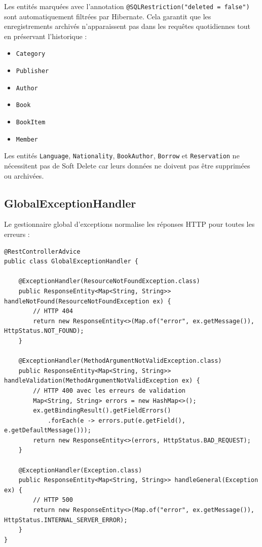 \documentclass[12pt,a4paper,twoside]{report}
\begin{document}
Les entités marquées avec l'annotation \texttt{@SQLRestriction("deleted = false")} sont automatiquement filtrées par Hibernate. Cela garantit que les enregistrements archivés n'apparaissent pas dans les requêtes quotidiennes tout en préservant l'historique :

\begin{itemize}
    \item \texttt{Category}
    \item \texttt{Publisher}
    \item \texttt{Author}
    \item \texttt{Book}
    \item \texttt{BookItem}
    \item \texttt{Member}
\end{itemize}

Les entités \texttt{Language}, \texttt{Nationality}, \texttt{BookAuthor}, \texttt{Borrow} et \texttt{Reservation} ne nécessitent pas de Soft Delete car leurs données ne doivent pas être supprimées ou archivées.

\subsection{GlobalExceptionHandler}

Le gestionnaire global d'exceptions normalise les réponses HTTP pour toutes les erreurs :

\begin{lstlisting}[caption=GlobalExceptionHandler (extrait)]
@RestControllerAdvice
public class GlobalExceptionHandler {

    @ExceptionHandler(ResourceNotFoundException.class)
    public ResponseEntity<Map<String, String>> handleNotFound(ResourceNotFoundException ex) {
        // HTTP 404
        return new ResponseEntity<>(Map.of("error", ex.getMessage()), HttpStatus.NOT_FOUND);
    }

    @ExceptionHandler(MethodArgumentNotValidException.class)
    public ResponseEntity<Map<String, String>> handleValidation(MethodArgumentNotValidException ex) {
        // HTTP 400 avec les erreurs de validation
        Map<String, String> errors = new HashMap<>();
        ex.getBindingResult().getFieldErrors()
            .forEach(e -> errors.put(e.getField(), e.getDefaultMessage()));
        return new ResponseEntity<>(errors, HttpStatus.BAD_REQUEST);
    }

    @ExceptionHandler(Exception.class)
    public ResponseEntity<Map<String, String>> handleGeneral(Exception ex) {
        // HTTP 500
        return new ResponseEntity<>(Map.of("error", ex.getMessage()), HttpStatus.INTERNAL_SERVER_ERROR);
    }
}
\end{lstlisting}
\end{document}
